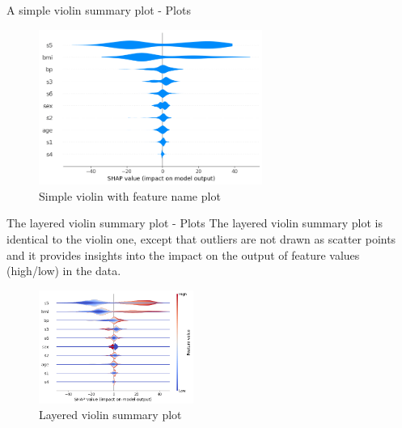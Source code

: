 \documentclass[aspectratio=169]{beamer}
\begin{document}
\begin{frame}{A simple violin summary plot - Plots}

    \begin{figure}[htbp]
        \centering
        \includegraphics[width=0.65\textwidth]{figs/shap/plots/violin/example_notebooks_api_examples_plots_violin_9_0.png}
        \caption{Simple violin with feature name plot}
        \label{fig:simple-violin-plot-name}
    \end{figure}
\end{frame}

\begin{frame}{The layered violin summary plot - Plots}
The layered violin summary plot is identical to the violin one, except that outliers are not drawn as scatter points and it provides insights into the impact on the output of feature values (high/low) in the data.
    \begin{figure}[htbp]
        \centering
        \includegraphics[width=0.45\textwidth]{figs/shap/plots/violin/example_notebooks_api_examples_plots_violin_12_0.png}
        \caption{Layered violin summary plot}
        \label{fig:layered-violin-plot}
    \end{figure}
\end{frame}
\end{document}
